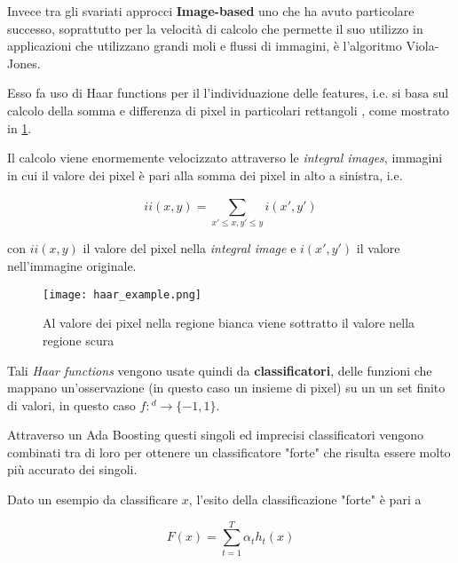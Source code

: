 Invece tra gli svariati approcci \textbf{Image-based} uno che ha avuto particolare successo, soprattutto per la 
velocità di calcolo che permette il suo utilizzo in applicazioni che utilizzano grandi 
moli e flussi di immagini, è l'algoritmo Viola-Jones.

\medskip

Esso fa uso di Haar functions per il l'individuazione delle features, i.e. 
si basa sul calcolo della somma e differenza di pixel in particolari rettangoli 
\cite{Viola2004}, come mostrato in \ref{fig:haar}.

Il calcolo viene enormemente velocizzato attraverso le \textit{integral images}, 
immagini in cui il valore dei pixel è pari alla somma dei pixel in alto a sinistra, i.e.

\begin{equation}
    ii(x,y) = \sum_{x'\leq x, y' \leq y}^{} i(x', y')
    \label{eq:}
\end{equation}

con $ii(x,y)$ il valore del pixel nella \textit{integral image} e $i(x',y')$ 
il valore nell'immagine originale.

\begin{figure}
    \begin{small}
        \begin{center}
            \texttt{[image: haar\_example.png]}
        \end{center}
        \caption{Al valore dei pixel nella regione bianca viene sottratto il valore nella regione scura 
            \cite{Viola2004}}
        \label{fig:haar}
    \end{small}
\end{figure}

\medskip

Tali \textit{Haar functions} vengono usate quindi da \textbf{classificatori}, 
delle funzioni che mappano un'osservazione (in questo caso un insieme di pixel) su un un set finito di valori, 
in questo caso \cite{Wang2014}
$f:$\Rset$^d\rightarrow \{-1, 1\}$.

Attraverso un Ada Boosting questi singoli ed imprecisi classificatori vengono combinati tra di loro
per ottenere un classificatore "forte" che risulta essere molto più accurato \cite{Schapire2013} dei singoli.

Dato un esempio da classificare $x$, l'esito della classificazione "forte" è pari a 

\begin{equation}
    F(x) = \sum_{t=1}^{T} \alpha_t h_t(x)
    \label{eq:}
\end{equation}

